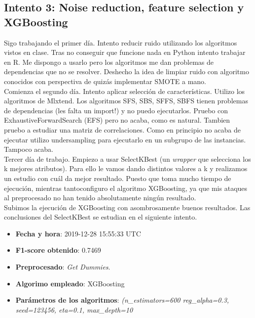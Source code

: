 \documentclass[11pt,a4paper]{article}
\begin{document}
	\subsection{Intento 3: Noise reduction, feature selection y XGBoosting}
	
	Sigo trabajando el primer día. Intento reducir ruido utilizando los algoritmos vistos en clase. Tras no conseguir que funcione nada en Python intento trabajar en R. Me dispongo a usarlo pero los algoritmos me dan problemas de dependencias que no se resolver. Deshecho la idea de limpiar ruido con algoritmo conocidos con perspectiva de quizás implementar SMOTE a mano. \\
	
	Comienza el segundo día. Intento aplicar selección de características. Utilizo los algoritmos de Mlxtend. Los algoritmos SFS, SBS, SFFS, SBFS tienen problemas de dependencias (les falta un import!) y no puedo ejecutarlos. Pruebo con ExhaustiveForwardSearch (EFS) pero no acaba, como es natural. Tambien pruebo a estudiar una matriz de correlaciones. Como en principio no acaba de ejecutar utilizo undersampling para ejecutarlo en un subgrupo de las instancias. Tampoco acaba. \\
	
	Tercer día de trabajo. Empiezo a usar SelectKBest (un \emph{wrapper} que selecciona los k mejores atributos). Para ello le vamos dando distintos valores a k y realizamos un estudio con cuál da mejor resultado. Puesto que toma mucho tiempo de ejecución, mientras tantoconfiguro el algoritmo XGBoosting, ya que mis ataques al preprocesado no han tenido absolutamente ningún resultado. \\
	
	Subimos la ejecución de XGBoosting con asombrosamente buenos resultados. Las conclusiones del SelectKBest se estudian en el siguiente intento. \\
	
	\begin{itemize}
		\item \textbf{Fecha y hora}: 2019-12-28 15:55:33 UTC
		\item \textbf{F1-score obtenido}: 0.7469
		\item \textbf{Preprocesado}: \emph{Get Dummies}.
		\item \textbf{Algorimo empleado}: XGBoosting
		\item \textbf{Parámetros de los algoritmos}: \emph{(n\_estimators=600 reg\_alpha=0.3, seed=123456, eta=0.1, max\_depth=10}
	\end{itemize}
	
\end{document}
